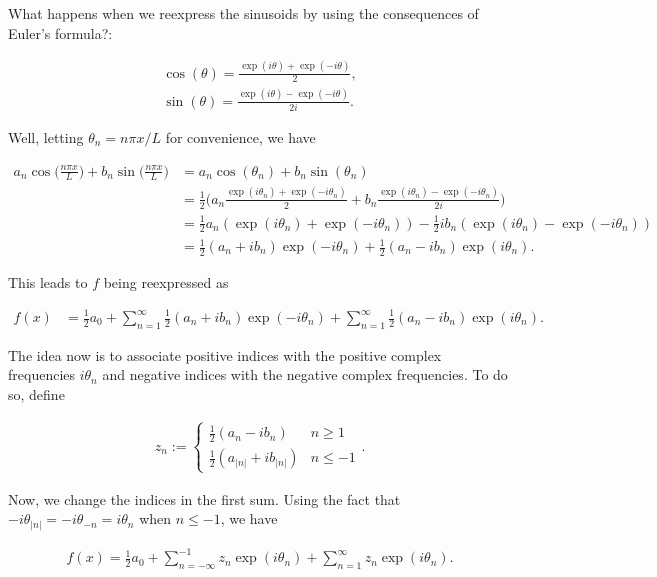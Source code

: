 \documentclass{article}
\begin{document}
What happens when we reexpress the sinusoids by using the consequences of Euler's formula?:

\begin{align*}
	\cos(\theta) = \frac{\exp(i\theta) + \exp(-i\theta)}{2}, \\
	\sin(\theta) = \frac{\exp(i\theta) - \exp(-i\theta)}{2i}.
\end{align*}

Well, letting $\theta_n = n\pi x/L$ for convenience, we have

\begin{align*}
	a_n \cos\Big(\frac{n\pi x}{L}\Big) + b_n \sin\Big(\frac{n\pi x}{L}\Big) &= 
	a_n\cos(\theta_n) + b_n\sin(\theta_n) \\
	&= \frac{1}{2}\Big(a_n\frac{\exp(i\theta_n) + \exp(-i\theta_n)}{2} + b_n\frac{\exp(i\theta_n) - \exp(-i\theta_n)}{2i}\Big) \\
	&= \frac{1}{2} a_n(\exp(i\theta_n) + \exp(-i\theta_n)) - \frac{1}{2} ib_n(\exp(i\theta_n) - \exp(-i\theta_n)) \\
	&= \frac{1}{2}(a_n + ib_n)\exp(-i\theta_n) + \frac{1}{2}(a_n - ib_n)\exp(i\theta_n).
\end{align*}

This leads to $f$ being reexpressed as

\begin{align*}
	f(x) &= \frac{1}{2} a_0 + \sum_{n = 1}^\infty \frac{1}{2} (a_n + ib_n)\exp(-i\theta_n) + \sum_{n = 1}^\infty \frac{1}{2} (a_n - ib_n)\exp(i\theta_n).
\end{align*}

The idea now is to associate positive indices with the positive complex frequencies $i\theta_n$ and negative indices with the negative complex frequencies. To do so, define

\begin{align*}
	z_n :=
	\begin{cases}
		\frac{1}{2}(a_n - ib_n) & n \geq 1 \\
		\frac{1}{2}(a_{|n|} + ib_{|n|}) & n \leq -1
	\end{cases}.
\end{align*}

Now, we change the indices in the first sum. Using the fact that $-i\theta_{|n|} = -i\theta_{-n} = i\theta_n$ when $n \leq -1$, we have

\begin{align*}
	f(x) = \frac{1}{2}a_0 + \sum_{n = -\infty}^{-1} z_n \exp(i\theta_n) + \sum_{n = 1}^\infty z_n \exp(i\theta_n).
\end{align*}
\end{document}
